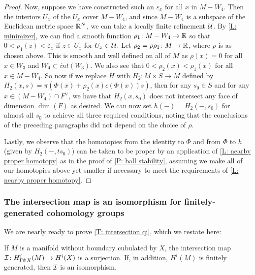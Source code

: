 \begin{proof}
	Now, suppose we have constructed such an $\varepsilon_x$ for all $x$ in $M - W_4$.
	Then the interiors $U_x$ of the $\bar U_x$ cover $M - W_4$, and since $M - W_4$ is a subspace of the Euclidean metric space $\mathbb{R}^N$, we can take a locally finite refinement $\mathcal{U}$.
	By \cref{L: minimizer}, we can find a smooth function $\rho_1 \colon M - W_4 \to \mathbb{R}$ so that $0<\rho_1(z)<\varepsilon_x$ if $z \in \bar U_x$ for $U_x \in \mathcal{U}$.
	Let $\rho_2 = \rho\rho_1 \colon M \to \mathbb{R}$, where $\rho$ is as chosen above.
	This is smooth and well defined on all of $M$ as $\rho(x) = 0$ for all $x \in W_3$ and $W_4 \subset int(W_3)$.
	We also see that $0<\rho_2(x)<\rho_1(x)$ for all $x \in M - W_4$.
	So now if we replace $H$ with $H_2 \colon M \times S \to M$ defined by $H_2(x,s) = \pi(\Phi(x)+\rho_2(x)\epsilon(\Phi(x)) s)$, then for any $s_0 \in S$ and for any $x \in (M - W_4) \cap F^\vee$, we have that $H_2(x,s_0)$ does not intersect any face of dimension $\dim(F)$ as desired.
	We can now set $h(-) = H_2(-,s_0)$ for almost all $s_0$ to achieve all three required conditions, noting that the conclusions of the preceding paragraphs did not depend on the choice of $\rho$.

	Lastly, we observe that the homotopies from the identity to $\Phi$ and from $\Phi$ to $h$ (given by $H_2(-,ts_0)$) can be taken to be proper by an application of \cref{L: nearby proper homotopy} as in the proof of \cref{P: ball stability}, assuming we make all of our homotopies above yet smaller if necessary to meet the requirements of \cref{L: nearby proper homotopy}.
\end{proof}

\subsubsection{The intersection map is an isomorphism for finitely-generated cohomology groups}

We are nearly ready to prove \cref{T: intersection qi}, which we restate here:



\begin{theorem*}
	If $M$ is a manifold without boundary cubulated by $X$, the intersection map $\mathcal{I} \colon H^i_{\Gamma \pitchfork X}(M) \to H^i(X)$ is a surjection.
	If, in addition, $H^i(M)$ is finitely generated, then $\mathcal{I}$ is an isomorphism.
\end{theorem*}

